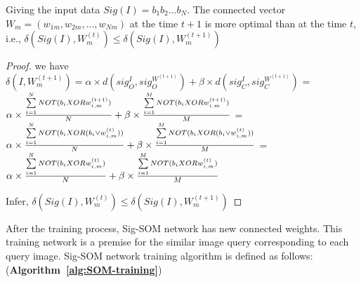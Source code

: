 \documentclass{amcs}
\begin{document}
\begin{theorem}{}
Giving the input data $Sig(I) = {b_1}{b_2}...{b_N}$. The connected vector ${W_m} = ({w_{1m}},{w_{2m}},...,{w_{Nm}})$ at the time $t + 1$ is more optimal than at the time $t$, i.e., $\delta (Sig(I),W_m^{(t)}) \le \delta (Sig(I),W_m^{(t + 1)})$
\end{theorem}
\begin{proof}{}

we have $\delta (I,W_m^{(t + 1)}) = \alpha  \times d(sig_O^I,sig_O^{{W^{(t + 1)}}}) + \beta  \times d(sig_C^I,sig_C^{{W^{(t + 1)}}})$
= $\alpha  \times \frac{{\sum\limits_{i = 1}^N {NOT({b_i}{\rm{ }}XOR{\rm{ }}w_{i,m}^{(t + 1)})} }}{N} + \beta  \times \frac{{\sum\limits_{i = 1}^M {NOT({b_i}{\rm{ }}XOR{\rm{ }}w_{i.m}^{(t + 1)})} }}{M}$
= $\alpha  \times \frac{{\sum\limits_{i = 1}^N {NOT({b_i}{\rm{ }}XOR{\rm{ (}}{b_i} \vee w_{i,m}^{(t)}{\rm{)}})} }}{N} + \beta  \times \frac{{\sum\limits_{i = 1}^M {NOT({b_i}{\rm{ }}XOR{\rm{ }}({b_i} \vee w_{i,m}^{(t)}))} }}{M}$
= $\alpha  \times \frac{{\sum\limits_{i = 1}^N {NOT({b_i}{\rm{ }}XOR{\rm{ }}w_{i,m}^{(t)})} }}{N} + \beta  \times \frac{{\sum\limits_{i = 1}^M {NOT({b_i}{\rm{ }}XOR{\rm{ }}w_{i,m}^{(t)})} }}{M}$

Infer, $\delta (Sig(I),W_m^{(t)}) \le \delta (Sig(I),W_m^{(t + 1)})$
\end{proof}
After the training process, Sig-SOM network has new connected weights. This training network is a premise for the similar image query corresponding to each query image. Sig-SOM network training algorithm is defined as follows: (\textbf{Algorithm~\ref{alg:SOM-training}})
\end{document}
